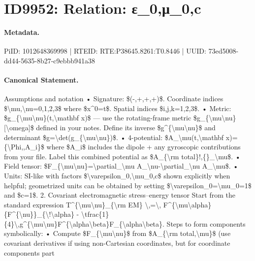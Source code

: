 \section*{ID9952: Relation: ε\_0,μ\_0,c}
\paragraph{Metadata.}
PiID: 1012648369998 | RTEID: RTE:P38645.8261:T0.8446 | UUID: 73ed5008-dd44-5635-8b27-c9ebbb941a38

\paragraph{Canonical Statement.}
Assumptions and notation • Signature: \$(-,+,+,+)\$. Coordinate indices \$\textbackslash{}mu,\textbackslash{}nu=0,1,2,3\$ where \$x\textasciicircum{}0=t\$. Spatial indices \$i,j,k=1,2,3\$. • Metric: \$g\_\{\textbackslash{}mu\textbackslash{}nu\}(t,\textbackslash{}mathbf x)\$ — use the rotating-frame metric \$g\_\{\textbackslash{}mu\textbackslash{}nu\}[\textbackslash{}omega]\$ defined in your notes. Define its inverse \$g\textasciicircum{}\{\textbackslash{}mu\textbackslash{}nu\}\$ and determinant \$g=\textbackslash{}det(g\_\{\textbackslash{}mu\textbackslash{}nu\})\$. • 4-potential: \$A\_\textbackslash{}mu(t,\textbackslash{}mathbf x)=\{\textbackslash{}Phi,,A\_i\}\$ where \$A\_i\$ includes the dipole + any gyroscopic contributions from your file. Label this combined potential as \$A\_\{\textbackslash{}rm total\}!,\{\}\_\textbackslash{}mu\$. • Field tensor: \$F\_\{\textbackslash{}mu\textbackslash{}nu\}=\textbackslash{}partial\_\textbackslash{}mu A\_\textbackslash{}nu-\textbackslash{}partial\_\textbackslash{}nu A\_\textbackslash{}mu\$. • Units: SI-like with factors \$\textbackslash{}varepsilon\_0,\textbackslash{}mu\_0,c\$ shown explicitly when helpful; geometrized units can be obtained by setting \$\textbackslash{}varepsilon\_0=\textbackslash{}mu\_0=1\$ and \$c=1\$. 2. Covariant electromagnetic stress–energy tensor Start from the standard expression T\textasciicircum{}\{\textbackslash{}mu\textbackslash{}nu\}\_\{\textbackslash{}rm EM\} \textbackslash{},=\textbackslash{}, F\textasciicircum{}\{\textbackslash{}mu\textbackslash{}alpha\}\{F\textasciicircum{}\{\textbackslash{}nu\}\}\_\{\textbackslash{}!\textbackslash{}alpha\} - \textbackslash{}tfrac\{1\}\{4\}\textbackslash{},g\textasciicircum{}\{\textbackslash{}mu\textbackslash{}nu\}F\textasciicircum{}\{\textbackslash{}alpha\textbackslash{}beta\}F\_\{\textbackslash{}alpha\textbackslash{}beta\}. Steps to form components symbolically: • Compute \$F\_\{\textbackslash{}mu\textbackslash{}nu\}\$ from \$A\_\{\textbackslash{}rm total,\textbackslash{}mu\}\$ (use covariant derivatives if using non-Cartesian coordinates, but for coordinate components part

